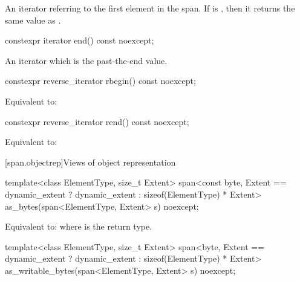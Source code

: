 \begin{itemdescr}
\pnum
\returns
An iterator referring to the first element in the span.
If  is , then it returns the
same value as .
\end{itemdescr}

%
\begin{itemdecl}
constexpr iterator end() const noexcept;
\end{itemdecl}

\begin{itemdescr}
\pnum
\returns
An iterator which is the past-the-end value.
\end{itemdescr}

%
\begin{itemdecl}
constexpr reverse_iterator rbegin() const noexcept;
\end{itemdecl}

\begin{itemdescr}
\pnum
\effects
Equivalent to: 
\end{itemdescr}

%
\begin{itemdecl}
constexpr reverse_iterator rend() const noexcept;
\end{itemdecl}

\begin{itemdescr}
\pnum
\effects
Equivalent to: 
\end{itemdescr}


[span.objectrep]{Views of object representation}

%
\begin{itemdecl}
template<class ElementType, size_t Extent>
  span<const byte, Extent == dynamic_extent ? dynamic_extent : sizeof(ElementType) * Extent>
    as_bytes(span<ElementType, Extent> s) noexcept;
\end{itemdecl}

\begin{itemdescr}
\pnum
\effects
Equivalent to: 
where  is the return type.
\end{itemdescr}

%
\begin{itemdecl}
template<class ElementType, size_t Extent>
  span<byte, Extent == dynamic_extent ? dynamic_extent : sizeof(ElementType) * Extent>
    as_writable_bytes(span<ElementType, Extent> s) noexcept;
\end{itemdecl}

